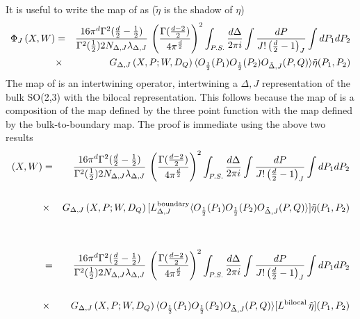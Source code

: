 \documentclass[a4paper,12pt]{article}
\def\bea{\begin{eqnarray}}
\def\eea{\end{eqnarray}}
\begin{document}
\begin{appendix}
It is useful to write the map of \cite{Aharony:2020omh} as ($\tilde{\eta}$ is the shadow of $\eta$)
%
\bea
\Phi_{J}\left(X,W\right)&=&
\frac{16\pi^d \Gamma^2(\frac{d}{2}-\frac{1}{2})}{\Gamma^2(\frac{1}{2})2N_{\Delta,J}\lambda_{\Delta,J}} \,
\left( \frac{\Gamma(\frac{d-2}{2})}{4\pi^{\frac{d}{2}}}\right)^2
\int_{P.S.}\frac{d\Delta}{2\pi i}\int 
	\frac{dP}{J!\left(\frac{d}{2}-1\right)_{J}}
\int dP_{1}dP_{2}\cr  
&\times& G_{\Delta,J}\left(X,P;W,D_Q\right)
	 \langle O_{\frac{1}{2}}(P_1)O_{\frac{1}{2}}(P_2)O_{\tilde\Delta,J}(P,Q)\rangle
       \tilde\eta(P_1,P_2)
\eea
%
The map of \cite{Aharony:2020omh} is an intertwining operator, intertwining a $\Delta,J$ representation
of the bulk SO(2,3) with the bilocal representation.
This follows because the map of \cite{Aharony:2020omh} is a composition of the map defined by the three point function
with the map defined by the bulk-to-boundary map.
The proof is immediate using the above two results
%
\bea
[L^{\rm bulk}_{\Delta,J}\,\Phi_{J}]\left(X,W\right)&=&
\frac{16\pi^d \Gamma^2(\frac{d}{2}-\frac{1}{2})}{\Gamma^2(\frac{1}{2})2N_{\Delta,J}\lambda_{\Delta,J}} \,
\left( \frac{\Gamma(\frac{d-2}{2})}{4\pi^{\frac{d}{2}}}\right)^2
\int_{P.S.}\frac{d\Delta}{2\pi i}\int 
	\frac{dP}{J!\left(\frac{d}{2}-1\right)_{J}}
\int dP_{1}dP_{2}\cr  \cr
&\times& G_{\Delta,J}\left(X,P;W,D_Q\right)
	 [L^{\rm boundary}_{\Delta,J}\langle O_{\frac{1}{2}}(P_1)O_{\frac{1}{2}}(P_2)O_{\tilde\Delta,J}(P,Q)\rangle]
       \tilde\eta(P_1,P_2)\cr\cr\cr
&=&
\frac{16\pi^d \Gamma^2(\frac{d}{2}-\frac{1}{2})}{\Gamma^2(\frac{1}{2})2N_{\Delta,J}\lambda_{\Delta,J}} \,
\left( \frac{\Gamma(\frac{d-2}{2})}{4\pi^{\frac{d}{2}}}\right)^2 \int_{P.S.}\frac{d\Delta}{2\pi i}\int 
\frac{dP}{J!\left(\frac{d}{2}-1\right)_{J}} \int dP_{1}dP_{2}\cr\cr  
&\times& G_{\Delta,J}\left(X,P;W,D_Q\right)
 \langle O_{\frac{1}{2}}(P_1)O_{\frac{1}{2}}(P_2)O_{\tilde\Delta,J}(P,Q)\rangle [L^{\rm bilocal}\,\tilde\eta] (P_1,P_2)\cr
&&
\eea


\end{appendix}
\end{document}
